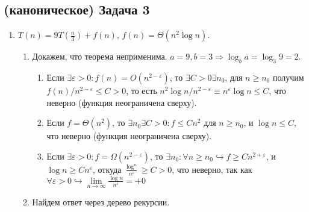 \documentclass[a4paper]{article}
\def\eps{\varepsilon}
\begin{document}
\subsection*{(каноническое) Задача 3}
\begin{enumerate}
\item $T(n)=9T(\frac{n}{3})+f(n)$, $f(n)=\Theta(n^2\log n)$.
\begin{enumerate}
\item Докажем, что теорема неприменима. $a=9,b=3\Rightarrow \log_b a=\log_3 9=2$.
\begin{enumerate}
\item Если $\exists \eps>0\colon f(n)=O(n^{2-\eps})$, то $\exists C>0\exists n_0$, для $n\geqslant n_0$ получим $f(n)/n^{2-\varepsilon}\leqslant C>0$, то есть $n^2\log n/n^{2-\eps}\equiv n^\varepsilon\log n\leqslant C$, что неверно (функция неограничена сверху).
\item Если $f=\Theta(n^2)$, то $\exists n_0\exists C>0\colon f\leqslant Cn^2$ для $n\geqslant n_0$, и $\log n\leqslant C$, что неверно (функция неограничена сверху).
\item Если $\exists \eps>0\colon f=\Omega(n^{2-\eps})$, то $\exists n_0\colon\forall n\geqslant n_0\hookrightarrow f\geqslant Cn^{2+\eps}$, и $\log n\geqslant Cn^\eps$, откуда $\frac{\log^n}{n^\eps}\geqslant C>0$, что неверно, так как $\forall\eps>0\hookrightarrow\lim\limits_{n\to\infty}\frac{\log n}{n^\eps}=+0$
\end{enumerate}
\item Найдем ответ через дерево рекурсии.
\newline
{}
\end{enumerate}
\end{enumerate}
\end{document}
